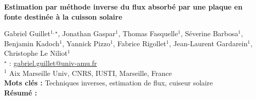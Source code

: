 


    \newpage


%
\begin{flushleft}
\addtocounter{section}{1}
{\Large \textbf{Estimation par méthode inverse du flux absorbé par une plaque en fonte destinée à la cuisson solaire}}\label{ref:59}
\end{flushleft}
%
Gabriel Guillet$^{1,\star}$, Jonathan Gaspar$^{1}$, Thomas Fasquelle$^{1}$, Séverine Barbosa$^{1}$, Benjamin Kadoch$^{1}$, Yannick Pizzo$^{1}$, Fabrice Rigollet$^{1}$, Jean-Laurent Gardarein$^{1}$, Christophe Le Niliot$^{1}$\\[2mm]
$^{\star}$ \Letter : \url{gabriel.guillet@univ-amu.fr}\\[2mm]
{\footnotesize $^{1}$ Aix Marseille Univ, CNRS, IUSTI, Marseille, France}\\
[4mm]
%
\noindent \textbf{Mots clés : } Techniques inverses, estimation de flux, cuiseur solaire\\[4mm]
%
\noindent \textbf{Résumé : } 

